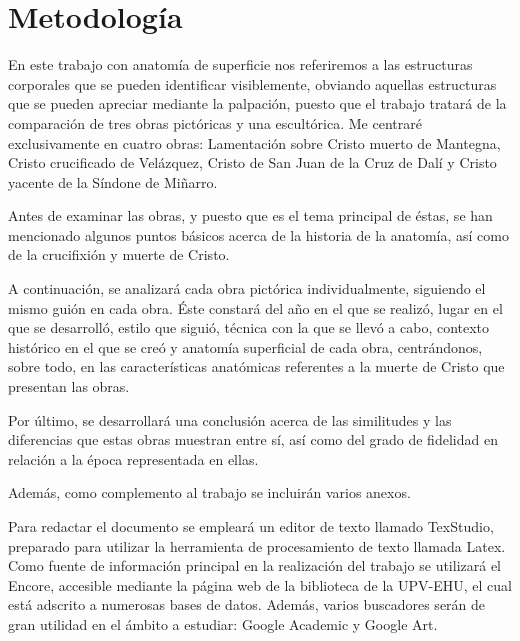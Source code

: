 \section{Metodología}
En este trabajo con anatomía de superficie nos referiremos a las estructuras corporales que se pueden identificar visiblemente, obviando aquellas estructuras que se pueden apreciar mediante la palpación, puesto que el trabajo tratará de la comparación de tres obras pictóricas y una escultórica. Me centraré exclusivamente en cuatro obras: Lamentación sobre Cristo muerto de Mantegna, Cristo crucificado de Velázquez,  %
Cristo de San Juan de la Cruz de Dalí y Cristo yacente de la Síndone de Miñarro.


Antes de examinar las obras, y puesto que es el tema principal de éstas, se han mencionado algunos puntos básicos acerca de la historia de la anatomía, así como de la crucifixión y muerte de Cristo.

A continuación, se analizará cada obra pictórica individualmente, siguiendo el mismo guión en cada obra. Éste constará del año en el que se realizó, lugar en el que se desarrolló, estilo que siguió, técnica con la que se llevó a cabo, contexto histórico en el que se creó y anatomía superficial de cada obra, centrándonos, sobre todo, en las características anatómicas referentes a la muerte de Cristo que presentan las obras.

Por último, se desarrollará una conclusión acerca de las similitudes y las diferencias que estas obras muestran entre sí, así como del grado de fidelidad en relación a la época representada en ellas.

Además, como complemento al trabajo se incluirán varios anexos.

\vspace{12pt}

Para redactar el documento se empleará un editor de texto llamado TexStudio, preparado para utilizar la herramienta de procesamiento de texto llamada Latex. Como fuente de información principal en la realización del trabajo se utilizará el Encore, accesible mediante la página web de la biblioteca de la UPV-EHU, el cual está adscrito a numerosas bases de datos. Además, varios buscadores serán de gran utilidad en el ámbito a estudiar: Google Academic y Google Art.

